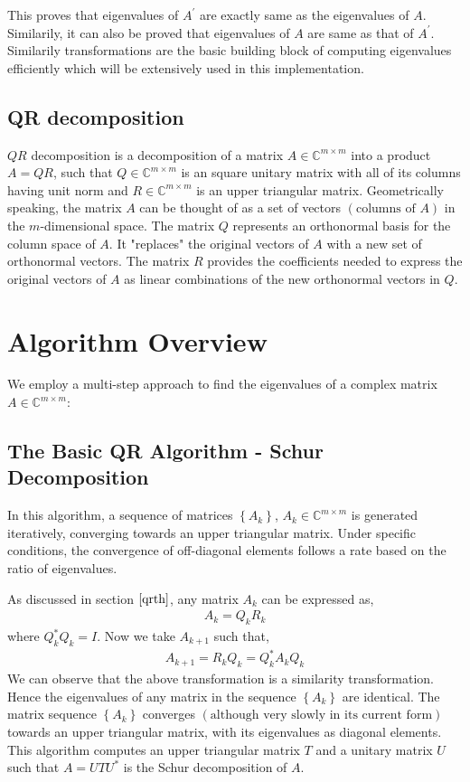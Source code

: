 \documentclass[12pt]{article}
\newcommand{\brak}[1]{\ensuremath{\left(#1\right)}}
\newcommand{\cbrak}[1]{\ensuremath{\left\{#1\right\}}}
\newcommand{\defmat}[2]{#1\in\mathbb{C}^{#2\times#2}}
\begin{document}
This proves that eigenvalues of $A^{\prime}$ are exactly same as the eigenvalues of $A$. Similarily, it can also be proved that eigenvalues of $A$ are same as that of $A^{\prime}$.
\newline
Similarily transformations are the basic building block of computing eigenvalues efficiently which will be extensively used in this implementation.

\subsection{QR decomposition} \label{qrth}
$QR$ decomposition is a decomposition of a matrix $\defmat{A}{m}$ into a product $A = QR$, such that $\defmat{Q}{m}$ is an square unitary matrix with all of its columns having unit norm and $\defmat{R}{m}$ is an upper triangular matrix. 
\newline
\newline
Geometrically speaking, the matrix $A$ can be thought of as a set of vectors \brak{\text{columns of } A} in the $m$-dimensional space.
The matrix $Q$ represents an orthonormal basis for the column space of $A$. It "replaces" the original vectors of $A$ with a new set of orthonormal vectors.
The matrix $R$ provides the coefficients needed to express the original vectors of $A$ as linear combinations of the new orthonormal vectors in $Q$.

\section{Algorithm Overview}
We employ a multi-step approach to find the eigenvalues of a complex matrix $\defmat{A}{m}$:

\subsection{The Basic QR Algorithm - Schur Decomposition}
In this algorithm, a sequence of matrices $\cbrak{A_k}$, $\defmat{A_k}{m}$ is generated iteratively, converging towards an upper triangular matrix. Under specific conditions, the convergence of off-diagonal elements follows a rate based on the ratio of eigenvalues.

As discussed in section $\ref{qrth}$, any matrix $A_k$ can be expressed as,
\begin{align}
    A_k = Q_k R_k
\end{align}
where $Q_k^{\ast}Q_k = I$.
\newline
Now we take $A_{k+1}$ such that,
\begin{align}
    A_{k + 1} = R_k Q_k = Q_k^{\ast} A_k Q_k
\end{align}
We can observe that the above transformation is a similarity transformation. Hence the eigenvalues of any matrix in the sequence $\cbrak{A_k}$ are identical.
\newline
The matrix sequence $\cbrak{A_k}$ converges \brak{\text{although very slowly in its current form}} towards an upper triangular matrix, with its eigenvalues as diagonal elements.
This algorithm computes an upper triangular matrix $T$ and a unitary matrix $U$ such that $A = UTU^{\ast}$ is the Schur decomposition of $A$.
\end{document}
